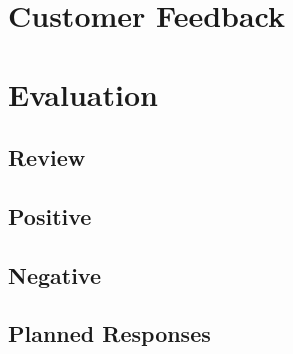 \section{Customer Feedback}
\section{Evaluation}
\subsection{Review}
\subsection{Positive}
\subsection{Negative}
\subsection{Planned Responses}
